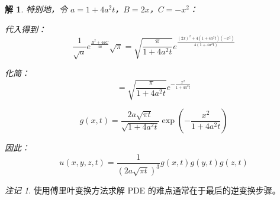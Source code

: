 \documentclass[12pt,a4paper]{article}
\numberwithin{subsection}{section}   %
\numberwithin{subsubsection}{subsection}
\theoremstyle{plain}
\newtheorem{solution}{解}[subsection]  %
\theoremstyle{definition}
\theoremstyle{remark}
\newtheorem{remark}{注记}[subsection] %
\theoremstyle{remark}
\begin{document}
\begin{solution}
特别地，令 \( a = 1 + 4a^2 t \)，\( B = 2x \)，\( C = -x^2 \)：

代入得到：
\begin{equation}
	\frac{1}{\sqrt{a}} e^{\frac{B^2 + 4aC}{4a}} \sqrt{\pi} = \sqrt{\frac{\pi}{1 + 4a^2 t}} e^{\frac{(2x)^2 + 4(1 + 4a^2 t)(-x^2)}{4(1 + 4a^2 t)}}
\end{equation}

化简：
\begin{equation}
	= \sqrt{\frac{\pi}{1 + 4a^2 t}} e^{-\frac{x^2}{1 + 4a^2 t}}
\end{equation}

\begin{equation}
	g(x, t) = \frac{2 a \sqrt{\pi t}}{\sqrt{1 + 4 a^2 t}} \exp\left( -\frac{x^2}{1 + 4 a^2 t} \right)
\end{equation}

因此：
\begin{equation}
	u(x, y, z, t) = \frac{1}{(2 a \sqrt{\pi t})^3} g(x, t) g(y, t) g(z, t)
\end{equation}

\end{solution}




\begin{remark}
	使用傅里叶变换方法求解 PDE 的难点通常在于最后的逆变换步骤。
\end{remark}
\end{document}
